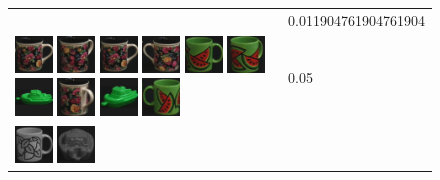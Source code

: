 \begin{figure}[tbp]
\begin{center}
\begin{tabular}{m{11cm} | m{3cm} |}
& {\scriptsize 0.011904761904761904}
\\
\includegraphics[width=1cm]{coil/beeld-60.eps}
\includegraphics[width=1cm]{coil/beeld-63.eps}
\includegraphics[width=1cm]{coil/beeld-60.eps}
\includegraphics[width=1cm]{coil/beeld-61.eps}
\includegraphics[width=1cm]{coil/beeld-30.eps}
\includegraphics[width=1cm]{coil/beeld-33.eps}
\includegraphics[width=1cm]{coil/beeld-54.eps}
\includegraphics[width=1cm]{coil/beeld-64.eps}
\includegraphics[width=1cm]{coil/beeld-57.eps}
\includegraphics[width=1cm]{coil/beeld-31.eps}
& {\scriptsize 0.05}
\\
\includegraphics[width=1cm]{coil/beeld-48.eps}
\includegraphics[width=1cm]{coil/beeld-26.eps}

\end{tabular}
\end{center}
\end{figure}
